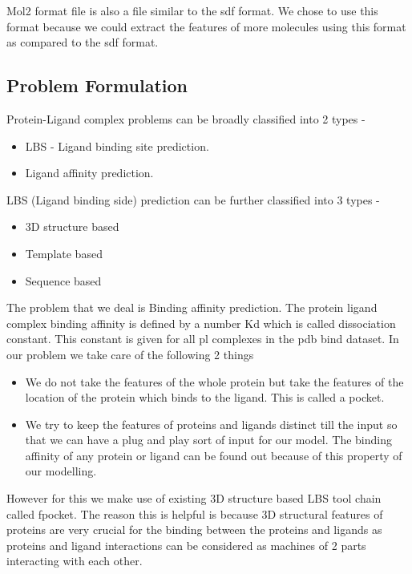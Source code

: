 \documentclass[11pt]{article}
\begin{document}
Mol2 format file is also a file similar to the sdf format.
We chose to use this format because we could extract the features of more molecules
using this format as compared to the sdf format.


\subsection{Problem Formulation}
Protein-Ligand complex problems can be broadly classified into 2 types -
\begin{itemize}
\item LBS - Ligand binding site prediction.
\item Ligand affinity prediction.
\end{itemize} 

LBS (Ligand binding side) prediction can be further classified into 3 types -
\begin{itemize}
\item 3D structure based
\item Template based
\item Sequence based
\end{itemize}

The problem that we deal is Binding affinity prediction. 
The protein ligand complex binding affinity is defined by a number Kd which is called dissociation constant.
This constant is given for all pl complexes in the pdb bind dataset.
In our problem we take care of the following 2 things
\begin{itemize}
\item We do not take the features of the whole protein
but take the features of the location of the protein which binds to the ligand.
This is called a pocket.
\item We try to keep the features of proteins and ligands distinct till the input so that we can have a plug and play sort of input for our model.
The binding affinity of any protein or ligand can be found out because of this property of our modelling.
\end{itemize}

However for this we make use of existing 3D structure based LBS tool chain called fpocket.
The reason this is helpful is because 3D structural features of proteins are very crucial for the binding between 
the proteins and ligands as proteins and ligand interactions can be considered as
machines of 2 parts interacting with each other.
\end{document}
